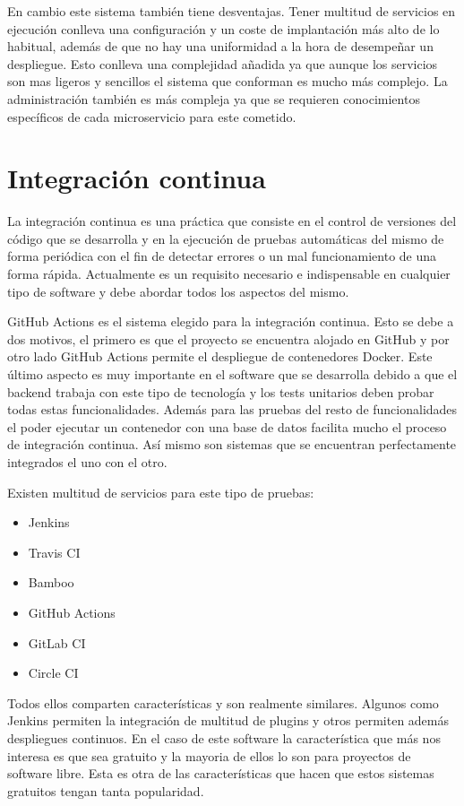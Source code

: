 En cambio este sistema también tiene desventajas. Tener multitud de servicios en ejecución conlleva una configuración y un coste de implantación más alto de lo habitual, además de que no hay una uniformidad a la hora de desempeñar un despliegue. Esto conlleva una complejidad añadida ya que aunque los servicios son mas ligeros y sencillos el sistema que conforman es mucho más complejo. La administración también es más compleja ya que se requieren conocimientos específicos de cada microservicio para este cometido.


\section{Integración continua}

La integración continua es una práctica que consiste en el control de versiones del código que se desarrolla y en la ejecución de pruebas automáticas del mismo de forma periódica con el fin de detectar errores o un mal funcionamiento de una forma rápida. Actualmente es un requisito necesario e indispensable en cualquier tipo de software y debe abordar todos los aspectos del mismo.

GitHub Actions es el sistema elegido para la integración continua. Esto se debe a dos motivos, el primero es que el proyecto se encuentra alojado en GitHub y por otro lado GitHub Actions permite el despliegue de contenedores Docker. Este último aspecto es muy importante en el software que se desarrolla debido a que el backend trabaja con este tipo de tecnología y los tests unitarios deben probar todas estas funcionalidades. Además para las pruebas del resto de funcionalidades el poder ejecutar un contenedor con una base de datos facilita mucho el proceso de integración continua. Así mismo son sistemas que se encuentran perfectamente integrados el uno con el otro.

Existen multitud de servicios para este tipo de pruebas:
\begin{itemize}
	\item Jenkins
	\item Travis CI
	\item Bamboo
	\item GitHub Actions
	\item GitLab CI
	\item Circle CI
\end{itemize}

Todos ellos comparten características y son realmente similares. Algunos como Jenkins permiten la integración de multitud de plugins y otros permiten además despliegues continuos. En el caso de este software la característica que más nos interesa es que sea gratuito y la mayoria de ellos lo son para proyectos de software libre. Esta es otra de las características que hacen que estos sistemas gratuitos tengan tanta popularidad.




